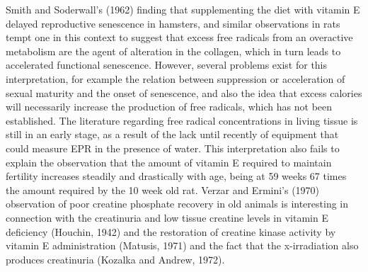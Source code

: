 Smith and Soderwall's (1962) finding that supplementing the diet with vitamin E delayed reproductive senescence in hamsters, and similar observations in rats tempt one in this context to suggest that excess free radicals from an overactive
metabolism are the agent of alteration in the collagen, which in turn leads to accelerated functional senescence. However, several problems exist for this interpretation, for example the relation between suppression or acceleration of sexual
maturity and the onset of senescence, and also the idea that excess calories will necessarily increase the production of free radicals, which has not been established. The literature regarding free radical concentrations in living tissue
is still in an early stage, as a result of the lack until recently of equipment that could measure EPR in the presence of water. This interpretation also fails to explain the observation that the amount of vitamin E required to maintain fertility
increases steadily and drastically with age, being at 59 weeks 67 times the amount required by the 10 week old rat. Verzar and Ermini's (1970) observation of poor creatine phosphate recovery in old animals is interesting in connection with the creatinuria
and low tissue creatine levels in vitamin E deficiency (Houchin, 1942) and the restoration of creatine kinase activity by vitamin E administration (Matusis, 1971) and the fact that the x-irradiation also produces creatinuria (Kozalka and Andrew, 1972).

